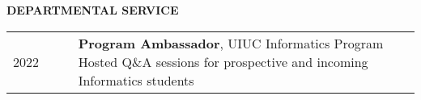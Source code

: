 \documentclass{acmcv}
\begin{document}
    \textbf{\uppercase{Departmental Service}}
    \begin{longtable}{p{0.16\linewidth} p{0.84\linewidth}}
        2022 & \textbf{Program Ambassador}, UIUC Informatics Program \newline Hosted Q\&A sessions for prospective and incoming Informatics students \\
    \end{longtable}

	
		
		
		
\end{document}
